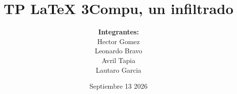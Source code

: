 \usepackage{amsmath}
\usepackage{amssymb}
\usepackage[a4paper, left=2.5cm, right=2.5cm, top=3cm, bottom=3cm]{geometry}

\title{TP LaTeX 3Compu, un infiltrado}
\author{
    \textbf{Integrantes:} \\
        Hector Gomez\\
        Leonardo Bravo\\
        Avril Tapia\\ 
        Lautaro Garcia
    }
\date{Septiembre 13 2026}


\newcommand{\N}{\mathbb{N}}
\newcommand{\Z}{\mathbb{Z}}
\newcommand{\R}{\mathbb{R}}

\newcommand{\seq}[1]{\langle#1\rangle}
\newcommand{\seqq}{\subseteq}
\newcommand{\set}[3]{\text{setAt} (#1,#2,#3)}



\newcommand{\dict}[1]{\text{dict}\{#1\}}


\newcommand{\QN}[1]{\hspace*{#1em}}

\newcommand{\imp}{\rightarrow}
\newcommand{\impl}{\rightarrow_{\text{L}}}


\newcommand{\type}[2]{&\text{type}~#1:~#2\\}

\newcommand{\ift}[3]{\text(IfThenElseIf)(#1,#2,#3)}

\newcommand{\obs}[2]{&\QN2\text{obs } #1=~#2\\}

\newcommand{\aux}[2]{&\QN2\textbf{aux } \text{#1} = #2\\}


\newcommand{\req}[1]{%
  & \QN{4} \textbf{requiere:}~\{ \\%
  & \QN{6} #1 \\%
  & \QN{4} \}%
}

\newcommand{\aseg}[1]{%
  & \QN{4} \textbf{asegura:}~\{ \\%
  & \QN{6} #1 \\%
  & \QN{4} \}%
}

